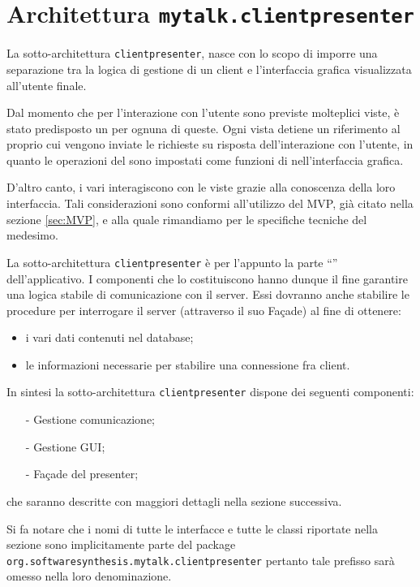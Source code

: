 \section{Architettura \texttt{mytalk.clientpresenter}}\label{sec:clientpresenter}
La sotto-architettura \texttt{clientpresenter}, nasce con lo scopo di imporre una separazione tra la logica di gestione di un client e l'interfaccia grafica visualizzata all'utente finale.

Dal momento che per l'interazione con l'utente sono previste molteplici viste, è stato predisposto un  per ognuna di queste. Ogni vista detiene un riferimento al proprio  cui vengono inviate le richieste su risposta dell'interazione con l'utente, in quanto le operazioni del  sono impostati come funzioni di  nell'interfaccia grafica.

D'altro canto, i vari  interagiscono con le viste grazie alla conoscenza della loro interfaccia. Tali considerazioni sono conformi all'utilizzo del  MVP, già citato nella sezione \ref{sec:MVP}, e alla quale rimandiamo per le specifiche tecniche del medesimo. 

La sotto-architettura \texttt{clientpresenter} è per l'appunto la parte ``'' dell'applicativo. I componenti che lo costituiscono hanno dunque il fine garantire una logica stabile di comunicazione con il server. Essi dovranno anche stabilire le procedure per interrogare il server (attraverso il suo Façade) al fine di ottenere:
\begin{itemize}
  \item i vari dati contenuti nel database;
  \item le informazioni necessarie per stabilire una connessione fra client.
\end{itemize}


In sintesi la sotto-architettura \texttt{clientpresenter} dispone dei seguenti componenti:
\begin{itemize}[noitemsep,nolistsep]
	\item[-] Gestione comunicazione;
	\item[-] Gestione GUI;
	\item[-] Façade del presenter;
\end{itemize}
che saranno descritte con maggiori dettagli nella sezione successiva.

Si fa notare che i nomi di tutte le interfacce e tutte le classi riportate nella sezione sono implicitamente parte del package \texttt{org.softwaresynthesis.mytalk.clientpresenter} pertanto tale prefisso sarà omesso nella loro denominazione.


